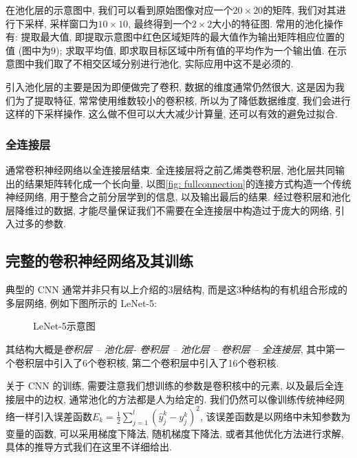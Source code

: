 \documentclass[lang=cn, 11pt,   a4paper]{elegantpaper}
\begin{document}
在池化层的示意图中, 我们可以看到原始图像对应一个$20\times20$的矩阵, 我们对其进行下采样, 采样窗口为$10\times10$, 最终得到一个$2\times2$大小的特征图. 常用的池化操作有:  提取最大值, 即提取示意图中红色区域矩阵的最大值作为输出矩阵相应位置的值 (图中为9); 求取平均值, 即求取目标区域中所有值的平均作为一个输出值. 在示意图中我们取了不相交区域分别进行池化, 实际应用中这不是必须的.

引入池化层的主要是因为即便做完了卷积, 数据的维度通常仍然很大, 这是因为我们为了提取特征, 常常使用维数较小的卷积核, 所以为了降低数据维度, 我们会进行这样的下采样操作. 这么做不但可以大大减少计算量, 还可以有效的避免过拟合.

\subsubsection{全连接层}
通常卷积神经网络以全连接层结束. 全连接层将之前乙烯类卷积层, 池化层共同输出的结果矩阵转化成一个长向量, 以图\ref{fig: fullconnection}的连接方式构造一个传统神经网络, 用于整合之前分层学到的信息, 以及输出最后的结果. 经过卷积层和池化层降维过的数据, 才能尽量保证我们不需要在全连接层中构造过于庞大的网络, 引入过多的参数. 

\subsection{完整的卷积神经网络及其训练}
典型的 CNN 通常并非只有以上介绍的3层结构, 而是这3种结构的有机组合形成的多层网络, 例如下图所示的 LeNet-5: 
\begin{figure}[H]
\label{fig: lenet}
\caption{LeNet-5示意图}
\end{figure}
其结构大概是\textit{卷积层 – 池化层- 卷积层 – 池化层 – 卷积层 – 全连接层}, 其中第一个卷积层中引入了6个卷积核, 第二个卷积层中引入了16个卷积核.

关于 CNN 的训练, 需要注意我们想训练的参数是卷积核中的元素, 以及最后全连接层中的边权, 通常池化的方法都是人为给定的. 我们仍然可以像训练传统神经网络一样引入误差函数$E_{k}=\frac{1}{2} \sum_{j=1}^{l}\left (\hat{y}_{j}^{k}-y_{j}^{k}\right)^{2}$, 该误差函数是以网络中未知参数为变量的函数, 可以采用梯度下降法, 随机梯度下降法, 或者其他优化方法进行求解, 具体的推导方式我们在这里不详细给出.
\end{document}
